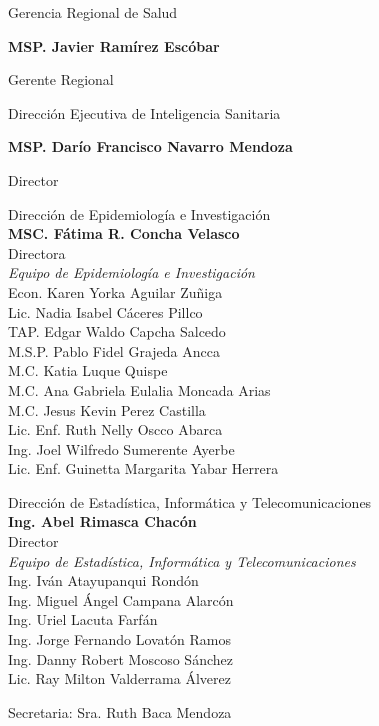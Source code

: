 \documentclass[12pt,a4paper,openany]{book}
\begin{document}
	
	\begin{center}
	
		{\large Gerencia Regional de Salud}
		
		\textbf{MSP. Javier Ramírez Escóbar}
		
		Gerente Regional \vspace{1.0cm}
		
		Dirección Ejecutiva de Inteligencia Sanitaria
		
		\textbf{MSP. Darío Francisco Navarro Mendoza}
		
		Director
		
		\vspace{1.5cm}
\noindent
\begin{minipage}[t]{.45\textwidth}
	\centering
	Dirección de Epidemiología e Investigación  \\
	\textbf{MSC. Fátima R. Concha Velasco}\\
	Directora \vspace{1.0cm}\\
	\textit{Equipo de Epidemiología e Investigación }\vspace{.5cm}\\
	Econ. Karen Yorka Aguilar Zuñiga \\
	Lic. Nadia Isabel Cáceres Pillco \\
	TAP. Edgar Waldo Capcha Salcedo \\
	M.S.P. Pablo Fidel Grajeda Ancca \\
	M.C. Katia Luque Quispe \\
	M.C. Ana Gabriela Eulalia Moncada Arias \\
	M.C. Jesus Kevin Perez Castilla \\
	Lic. Enf. Ruth Nelly Oscco Abarca \\
	Ing. Joel Wilfredo Sumerente Ayerbe \\
	Lic. Enf. Guinetta Margarita Yabar Herrera \vspace{1.5cm}\\	
\end{minipage}
\hfill
\noindent
\begin{minipage}[t]{.45\textwidth}
	\centering
	Dirección de Estadística, Informática y Telecomunicaciones\\
	\textbf{Ing. Abel Rimasca Chacón} \\
	Director \vspace{1.0cm} \\
	\textit{Equipo de Estadística, Informática y Telecomunicaciones} \vspace{.5cm} \\
	Ing. Iván Atayupanqui Rondón \\
	Ing. Miguel Ángel Campana Alarcón \\
	Ing. Uriel Lacuta Farfán \\
	Ing. Jorge Fernando Lovatón Ramos \\
	Ing. Danny Robert Moscoso Sánchez \\
	Lic. Ray Milton Valderrama Álverez \vspace{1.5cm}\\
\end{minipage}
Secretaria: Sra. Ruth Baca Mendoza
	\end{center}
\end{document}
